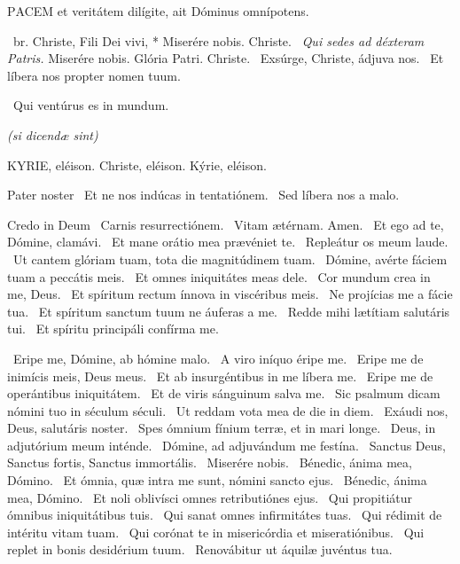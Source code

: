 

\lettrine[lines=2]{P}{ACEM} et veritátem dilígite, ait Dóminus omnípotens.

\R\ br. Christe, Fili Dei vivi, * Miserére nobis. Christe. \V\ \textit{Qui sedes ad déxteram Patris.} Miserére nobis. Glória Patri. Christe. \V\ Exsúrge, Christe, ádjuva nos. \R\ Et líbera nos propter nomen tuum.

 \V\ Qui ventúrus es in mundum.


\textit{(si dicendæ sint)}

KYRIE, eléison. Christe, eléison. Kýrie, eléison.

Pater noster  \V\ Et ne nos indúcas in tentatiónem. \R\ Sed líbera nos a malo.

Credo in Deum  \V\ Carnis resurrectiónem. \R\ Vitam ætérnam. Amen. \V\ Et ego ad te, Dómine, clamávi. \R\ Et mane orátio mea prævéniet te. \V\ Repleátur os meum laude. \R\ Ut cantem glóriam tuam, tota die magnitúdinem tuam. \V\ Dómine, avérte fáciem tuam a peccátis meis. \R\ Et omnes iniquitátes meas dele. \V\ Cor mundum crea in me, Deus. \R\ Et spíritum rectum ínnova in viscéribus meis. \V\ Ne projícias me a fácie tua. \R\ Et spíritum sanctum tuum ne áuferas a me. \V\ Redde mihi lætítiam salutáris tui. \R\ Et spíritu principáli confírma me.


\V\ Eripe me, Dómine, ab hómine malo. \R\ A viro iníquo éripe me. \V\ Eripe me de inimícis meis, Deus meus. \R\ Et ab insurgéntibus in me líbera me. \V\ Eripe me de operántibus iniquitátem. \R\ Et de viris sánguinum salva me. \V\ Sic psalmum dicam nómini tuo in séculum séculi. \R\ Ut reddam vota mea de die in diem. \V\ Exáudi nos, Deus, salutáris noster. \R\ Spes ómnium fínium terræ, et in mari longe. \V\ Deus, in adjutórium meum inténde. \R\ Dómine, ad adjuvándum me festína. \V\ Sanctus Deus, Sanctus fortis, Sanctus immortális. \R\ Miserére nobis. \V\ Bénedic, ánima mea, Dómino. \R\ Et ómnia, quæ intra me sunt, nómini sancto ejus. \V\ Bénedic, ánima mea, Dómino. \R\ Et noli oblivísci omnes retributiónes ejus. \V\ Qui propitiátur ómnibus iniquitátibus tuis. \R\ Qui sanat omnes infirmitátes tuas. \V\ Qui rédimit de intéritu vitam tuam. \R\ Qui corónat te in misericórdia et miseratiónibus. \V\ Qui replet in bonis desidérium tuum. \R\ Renovábitur ut áquilæ juvéntus tua.

